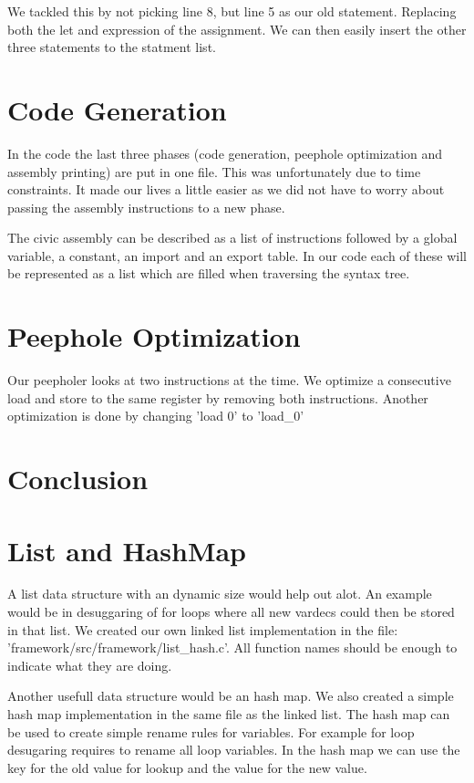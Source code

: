 \documentclass[a4paper]{article}
\begin{document}
We tackled this by not picking line 8, but line 5 as our old statement. Replacing
both the let and expression of the assignment. We can then easily insert the
other three statements to the statment list.

\section{Code Generation}
In the code the last three phases (code generation, peephole optimization and
assembly printing) are put in one file. This was unfortunately due to time
constraints. It made our lives a little easier as we did not have to worry
about passing the assembly instructions to a new phase.

The civic assembly can be described as a list of instructions followed by
a global variable, a constant, an import and an export table. In our code each
of these will be represented as a list which are filled when traversing the syntax tree.





\section{Peephole Optimization}
Our peepholer looks at two instructions at the time. We optimize a consecutive
load and store to the same register by removing both instructions.
Another optimization is done by changing 'load 0' to 'load\_0'



\section{Conclusion}


\section{List and HashMap}
A list data structure with an dynamic size would help out alot. An example
would be in  desuggaring of for loops where all new vardecs could then be
stored in that list. We created our own linked list implementation in the file:
'framework/src/framework/list\_hash.c'. All function names should be enough to
indicate what they are doing.

Another usefull data structure would be an hash map. We also created a simple
hash map implementation in the same file as the linked list. The hash map can
be used to create simple rename rules for variables. For example for loop
desugaring requires to rename all loop variables. In the hash map we can use
the key for the old value for lookup and the value for the new value.



\end{document}
